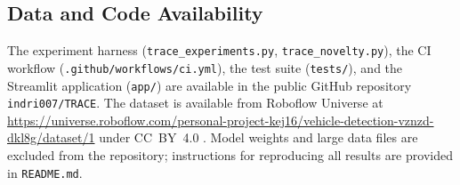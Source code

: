 \subsection*{Data and Code Availability}

The experiment harness (\texttt{trace\_experiments.py},
\texttt{trace\_novelty.py}), the CI workflow
(\texttt{.github/workflows/ci.yml}), the test suite (\texttt{tests/}),
and the Streamlit application (\texttt{app/}) are available in the public
GitHub repository \texttt{indri007/TRACE}.
The dataset is available from Roboflow Universe at
\url{https://universe.roboflow.com/personal-project-kej16/vehicle-detection-vznzd-dkl8g/dataset/1}
under CC~BY~4.0 \cite{roboflow_dataset}.
Model weights and large data files are excluded from the repository;
instructions for reproducing all results are provided in
\texttt{README.md}.
